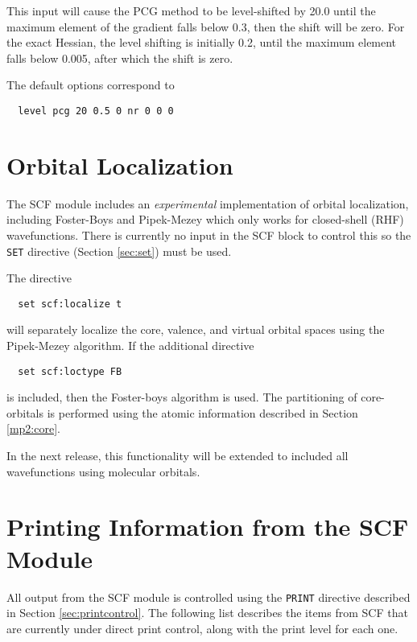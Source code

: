 This input will cause the PCG method to be level-shifted by 20.0 until
the maximum element of the gradient falls below 0.3, then the shift
will be zero.  For the exact Hessian, the level shifting is initially
0.2, until the maximum element falls below 0.005, after which the
shift is zero. 

The default options correspond to
\begin{verbatim}
  level pcg 20 0.5 0 nr 0 0 0
\end{verbatim}

\section{Orbital Localization}
\label{orbloc}
The SCF module includes an {\em experimental} implementation of
orbital localization, including Foster-Boys and Pipek-Mezey which only
works for closed-shell (RHF) wavefunctions. There is currently no
input in the SCF block to control this so the \verb+SET+ directive
(Section \ref{sec:set}) must be used.

The directive
\begin{verbatim}
  set scf:localize t
\end{verbatim}
will separately localize the core, valence, and virtual orbital spaces
using the Pipek-Mezey algorithm.  If the additional directive
\begin{verbatim}
  set scf:loctype FB
\end{verbatim}
is included, then the Foster-boys algorithm is used.  The partitioning
of core-orbitals is performed using the atomic information described
in Section \ref{mp2:core}.

In the next release, this functionality will be extended to included all
wavefunctions using molecular orbitals.


\newpage
\section{Printing Information from the SCF Module}
\label{sec:scfprint}

All output from the SCF module is controlled using the \verb+PRINT+
directive described in Section \ref{sec:printcontrol}.  The following 
list describes the items from SCF that are currently under direct 
print control, along with the print level for each one.

